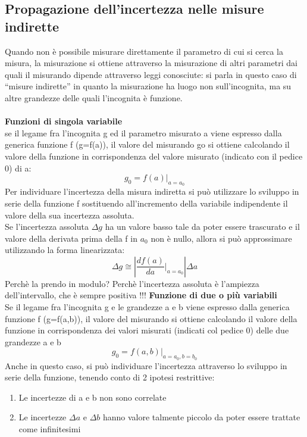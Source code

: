 \documentclass{article}
\begin{document}
\subsection{Propagazione dell'incertezza nelle misure indirette}
Quando non è possibile misurare direttamente il parametro di cui si cerca la misura, la 
misurazione si ottiene attraverso la misurazione di altri parametri dai quali il misurando dipende 
attraverso leggi conosciute: si parla in questo caso di “misure indirette” in quanto la misurazione 
ha luogo non sull’incognita, ma su altre grandezze delle quali l’incognita è funzione. \\\\
\textbf{Funzioni di singola variabile } \\
se il legame fra l’incognita g ed il parametro misurato a viene espresso dalla generica 
funzione f (g=f(a)), il valore del misurando go si ottiene calcolando il valore della funzione 
in corrispondenza del valore misurato (indicato con il pedice 0) di a: 
\begin{equation}
    g_{0}=f(a)\vert_{a=a_{0}}
\end{equation}
Per individuare l'incertezza della misura indiretta si può utilizzare lo sviluppo in serie della 
funzione f sostituendo all'incremento della variabile indipendente il valore della sua 
incertezza assoluta.\\ Se l’incertezza assoluta $\Delta g$ ha un valore basso tale da poter essere 
trascurato e il valore della derivata prima della f in $a_{0}$ non è nullo, allora si può 
approssimare utilizzando la forma linearizzata:
\begin{equation}
    \Delta g \cong \left| \frac{df(a)}{da}\vert_{a=a_{0}} \right| \Delta a
\end{equation}
Perchè la prendo in modulo? Perchè l'incertezza assoluta è l'ampiezza dell'intervallo, che è sempre positiva !!!
\newpage
\noindent
\textbf{Funzione di due o più variabili }\\
Se il legame fra l’incognita g e le grandezze a e b viene espresso dalla generica funzione f 
(g=f(a,b)), il valore del misurando si ottiene calcolando il valore della funzione in 
corrispondenza dei valori misurati (indicati col pedice 0) delle due grandezze a e b
\begin{equation}
    g_{0}=f(a,b)\vert_{a=a_{0},b=b_{0}}
\end{equation}
Anche in questo caso, si può individuare l'incertezza attraverso lo sviluppo in serie della 
funzione, tenendo conto di 2 ipotesi restrittive: 
\begin{enumerate}
    \item Le incertezze di a e b non sono correlate 
    \item Le incertezze $\Delta a$ e $\Delta b$ hanno valore talmente piccolo da poter essere trattate come 
infinitesimi 
\end{enumerate}
\end{document}
